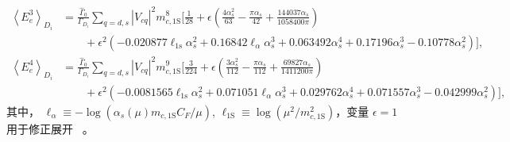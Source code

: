 \begin{equation}
    \begin{aligned}
        \left\langle E_e^3\right\rangle_{D_{i}}&=\frac{\hat{\Gamma}_0}{\Gamma_{D_{i}}}\sum_{q=d,s}\left|V_{cq}\right|^2 m_{c,\mathrm{1S}}^8 \Big[\frac{1}{28}+\epsilon  \left(\frac{4 \alpha_s^2}{63}-\frac{\pi  \alpha _s}{42}+\frac{144037 \alpha_s}{1058400 \pi }\right)\nonumber \\
           & \qquad +\epsilon ^2 \left(-0.020877 \ell_{\text{1s}} \alpha_s^2+0.16842 \ell_{\alpha} \alpha_s^3+0.063492 \alpha_s^4+0.17196 \alpha_s^3-0.10778 \alpha_s^2\right)   \Big],\nonumber \\
         \left\langle E_e^4\right\rangle_{D_i}&=\frac{\hat{\Gamma}_0}{\Gamma_{D_{i}}}\sum_{q=d,s}\left|V_{cq}\right|^2 m_{c,\mathrm{1S}}^9 \Big[ \frac{3}{224}+\epsilon  \left(\frac{3 \alpha_s^2}{112}-\frac{\pi  \alpha _s}{112}+\frac{69827 \alpha_s}{1411200 \pi }\right)\nonumber \\
            & \qquad +\epsilon^2 \left(-0.0081565 \ell_{\text{1s}} \alpha_s^2+0.071051 \ell_{\alpha} \alpha_s^3+0.029762 \alpha_s^4+0.071557 \alpha_s^3-0.042999 \alpha_s^2\right)  \Big],\nonumber 
    \end{aligned}
    \label{eq:1s-highmoments}
\end{equation}
其中， $\ell_\alpha\equiv -\log({\alpha_s(\mu) m_{c,\mathrm{1S}} C_F}/\mu)$, $\ell_{\text{1S}}\equiv \log(\mu^2/m_{c,\mathrm{1S}}^2)$，变量 $\epsilon=1$用于修正展开 ~\cite{Hoang:1998hm}。
